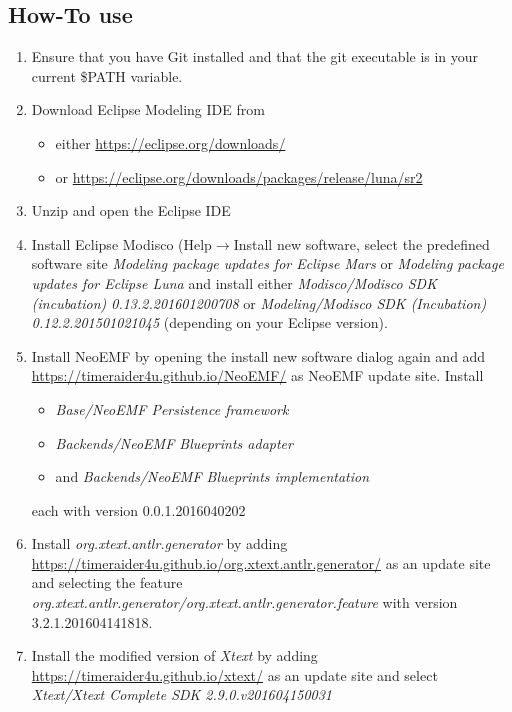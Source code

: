 \subsection{How-To use}\label{sec:howToUse}
\begin{enumerate}
 \item Ensure that you have Git installed and that the git executable is in your current \$PATH variable.
 \item\label{howToUseDownload} Download Eclipse Modeling IDE from 
 \begin{itemize}
  \item either \url{https://eclipse.org/downloads/}\cite{Eclipse_1}
  \item or \url{https://eclipse.org/downloads/packages/release/luna/sr2}\cite{Eclipse_2}
 \end{itemize}
 \item Unzip and open the Eclipse IDE
 \item Install Eclipse Modisco (Help$\rightarrow$Install new software, 
 select the predefined software site {\it Modeling package updates for Eclipse Mars}\cite{Eclipse_3}
 or {\it Modeling package updates for Eclipse Luna}\cite{Eclipse_4}
 and install either {\it Modisco/Modisco SDK (incubation) 0.13.2.201601200708}
 or {\it Modeling/Modisco SDK (Incubation) 0.12.2.201501021045} (depending on your Eclipse version). 
 \item Install NeoEMF by opening the install new software dialog again and add 
  \url{https://timeraider4u.github.io/NeoEMF/}\cite{Eclipse_5} as NeoEMF update site. Install
  \begin{itemize}
   \item {\it Base/NeoEMF Persistence framework}
   \item {\it Backends/NeoEMF Blueprints adapter}
   \item and {\it Backends/NeoEMF Blueprints implementation}
  \end{itemize}
  each with version 0.0.1.2016040202
  \item Install {\it org.xtext.antlr.generator} 
  by adding \url{https://timeraider4u.github.io/org.xtext.antlr.generator/}\cite{Eclipse_6} 
  as an update site and selecting the feature {\it org.xtext.antlr.generator/org.xtext.antlr.generator.feature} 
  with version 3.2.1.201604141818.
  \item\label{howToUseXtextInstall} Install the modified version of {\it Xtext}
  by adding \url{https://timeraider4u.github.io/xtext/}\cite{Eclipse_7} as an update site 
  and select {\it Xtext/Xtext Complete SDK 2.9.0.v201604150031}

\end{enumerate}
